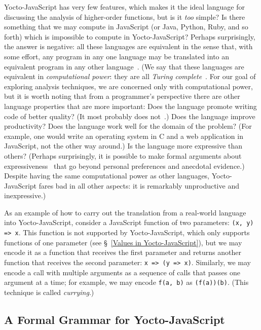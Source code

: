 \documentclass[12pt, oneside]{book}
\begin{document}
Yocto-JavaScript has very few features, which makes it the ideal language for discussing the analysis of higher-order functions, but is it \emph{too} simple? Is there something that we may compute in JavaScript (or Java, Python, Ruby, and so forth) which is impossible to compute in Yocto-JavaScript? Perhaps surprisingly, the answer is negative: all these languages are equivalent in the sense that, with some effort, any program in any one language may be translated into an equivalent program in any other language~\cite[§~6]{understanding-computation}. (We say that these languages are equivalent in \emph{computational power}: they are all \emph{Turing complete}~\cite[§~7]{understanding-computation}. For our goal of exploring analysis techniques, we are concerned only with computational power, but it is worth noting that from a programmer’s perspective there are other language properties that are more important: Does the language promote writing code of better quality? (It most probably does not~\cite{code-quality}.) Does the language improve productivity? Does the language work well for the domain of the problem? (For example, one would write an operating system in C and a web application in JavaScript, not the other way around.) Is the language more expressive than others? (Perhaps surprisingly, it is possible to make formal arguments about expressiveness~\cite{expressive-power} that go beyond personal preferences and anecdotal evidence.) Despite having the same computational power as other languages, Yocto-JavaScript fares bad in all other aspects: it is remarkably unproductive and inexpressive.)

As an example of how to carry out the translation from a real-world language into Yocto-JavaScript, consider a JavaScript function of two parameters: \texttt{(x, y) => x}. This function is not supported by Yocto-JavaScript, which only supports functions of one parameter (see §~\ref{Values in Yocto-JavaScript}), but we may encode it as a function that receives the first parameter and returns another function that receives the second parameter: \texttt{x => (y => x)}. Similarly, we may encode a call with multiple arguments as a sequence of calls that passes one argument at a time; for example, we may encode \texttt{f(a, b)} as \texttt{(f(a))(b)}. (This technique is called \emph{currying}.)

\subsection{A Formal Grammar for Yocto-JavaScript}
\label{A Formal Grammar for Yocto-JavaScript}
\end{document}
